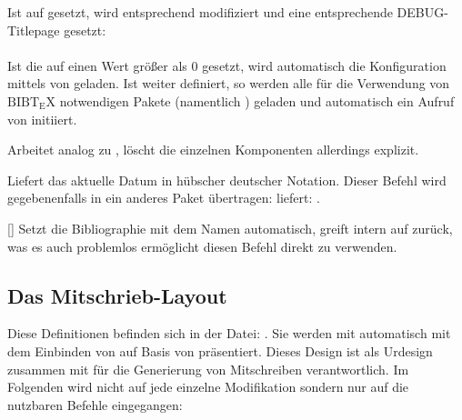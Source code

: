 Ist  auf  gesetzt, wird  entsprechend modifiziert und eine entsprechende DEBUG-Titlepage gesetzt:\smallskip\\
\makeatletter%
\framebox{%
    \@@Debug@Page@Content%
}~\\

Ist die  auf einen Wert größer als $0$ gesetzt, wird automatisch die Konfiguration mittels von  geladen. Ist weiter  definiert, so werden alle für die Verwendung von $\mathrm{B{\scriptstyle{IB}} \! T\!_{\displaystyle E} \! X}$ %
 notwendigen Pakete (namentlich ) geladen und automatisch ein Aufruf von  initiiert.

%
%
%

Arbeitet analog zu , löscht die einzelnen Komponenten allerdings explizit.

%
%
%

Liefert das aktuelle Datum in hübscher deutscher Notation. Dieser Befehl wird gegebenenfalls in ein anderes Paket übertragen:  liefert: \heute.

%
%
%

[]
Setzt die Bibliographie mit dem Namen  automatisch, greift intern auf  zurück, was es auch problemlos ermöglicht diesen Befehl direkt zu verwenden.

%
%
%
%
%

\subsection{Das Mitschrieb-Layout}
Diese Definitionen befinden sich in der Datei: . Sie werden mit  automatisch mit dem Einbinden von  auf Basis von  präsentiert. \newline
Dieses Design ist als Urdesign zusammen mit  für die Generierung von Mitschreiben verantwortlich. Im Folgenden wird nicht auf jede einzelne Modifikation sondern nur auf die nutzbaren Befehle eingegangen:
\begin{tcbraster}[raster columns=3, blankest,graphics pages={1,2,3},colback=white]
\end{tcbraster}

